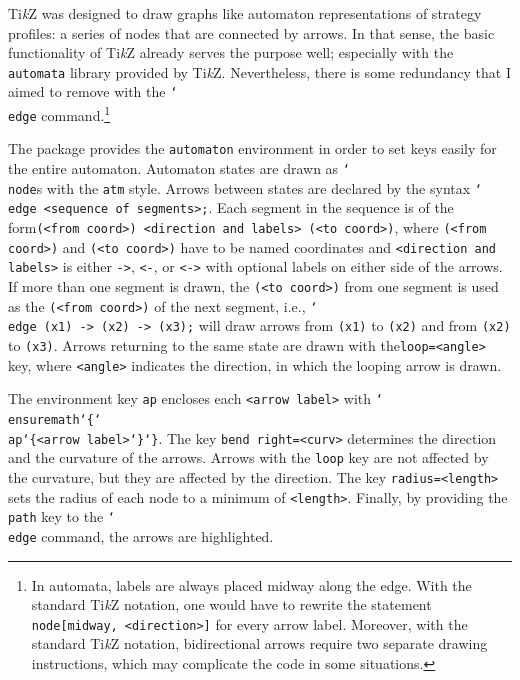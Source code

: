 \documentclass{article}
\renewcommand{\textbackslash}{\char`\\}
\def\cmd#1{\texttt{\color{cmd}\textbackslash#1}}
\def\leftbrace{\char`\{}
\def\rightbrace{\char`\}}
\def\arg#1{{\color{cmd}\leftbrace}{\color{black}#1}{\color{cmd}\rightbrace}}
\def\largeskip{\vskip9pt plus 3pt minus 3pt}
\def\TikZ{Ti\emph{k}Z\xspace}
\begin{document}
\TikZ was designed to draw graphs like automaton representations of strategy profiles: a series of nodes that are connected by arrows. In that sense, the basic functionality of \TikZ already serves the purpose well; especially with the \texttt{automata} library provided by \TikZ. Nevertheless, there is some redundancy that I aimed to remove with the \cmd{edge} command.\footnote{In automata, labels are always placed midway along the edge. With the standard \TikZ notation, one would have to rewrite the statement \texttt{node[midway, <direction>]} for every arrow label. Moreover, with the standard \TikZ notation, bidirectional arrows require two separate drawing instructions, which may complicate the code in some situations.}

The package provides the \texttt{automaton} environment in order to set keys easily for the entire automaton. Automaton states are drawn as \cmd{node}s with the \texttt{atm} style. Arrows between states are declared by the syntax \cmd{edge}\texttt{ <sequence of segments>;}. Each segment in the sequence is of the form\texttt{(<from coord>) <direction and labels> (<to coord>)}, where \texttt{(<from coord>)} and \texttt{(<to coord>)} have to be named coordinates and \texttt{<direction and labels>} is either \texttt{->}, \texttt{<-}, or \texttt{<->} with optional labels on either side of the arrows. If more than one segment is drawn, the \texttt{(<to coord>)} from one segment is used as the \texttt{(<from coord>)} of the next segment, i.e., \cmd{edge}\texttt{ (x1) -> (x2) -> (x3);} will draw arrows from \texttt{(x1)} to \texttt{(x2)} and from \texttt{(x2)} to \texttt{(x3)}. Arrows returning to the same state are drawn with the\linebreak \texttt{loop=<angle>} key, where \texttt{<angle>} indicates the direction, in which the looping arrow is drawn.

The environment key \texttt{ap} encloses each \texttt{<arrow label>} with \cmd{ensuremath\arg{\cmd{ap}\arg{\texttt{<arrow label>}}}}. The key \texttt{bend right=<curv>} determines the direction and the curvature of the arrows. Arrows with the \texttt{loop} key are not affected by the curvature, but they are affected by the direction. The key \texttt{radius=<length>} sets the radius of each node to a minimum of \texttt{<length>}. %
Finally, by providing the \texttt{path} key to the \cmd{edge} command, the arrows are highlighted.\largeskip %
\end{document}
